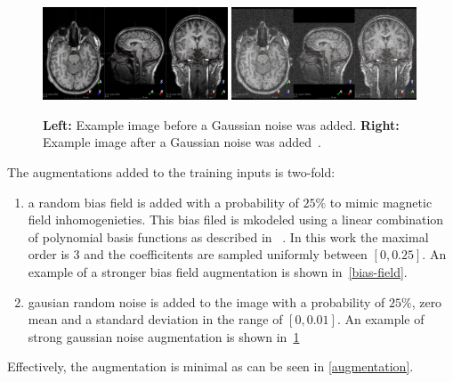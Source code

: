    \begin{figure}[h]
   \begin{center}
      \includegraphics[keepaspectratio, width=0.49\textwidth]{img/random_noise-0.png}
      \includegraphics[keepaspectratio, width=0.49\textwidth]{img/random_noise-1.png}
   \end{center}
   \caption{
      \textbf{Left:} Example image before a Gaussian noise was added.
      \textbf{Right:} Example image after a Gaussian noise was added~\autocite{noauthor_augmentation_nodate}.
   }
   \label{random-noise}
\end{figure}


The augmentations added to the training inputs is two-fold:
\begin{enumerate}
 \item a random bias field is added with a probability of $25\%$ to mimic magnetic field inhomogenieties. This bias filed is mkodeled using a linear combination of polynomial basis functions as described in ~\autocite{van_leemput_automated_1999}.
      In this work the maximal order is $3$ and the coefficitents are sampled uniformly between $[0, 0.25]$.
      An example of a stronger bias field augmentation is shown in~\ref{bias-field}.

 \item gausian random noise is added to the image with a probability of $25\%$, zero mean and a standard deviation in the range of $[0, 0.01]$.
      An example of strong gaussian noise augmentation is shown in~\ref{random-noise}
\end{enumerate}
Effectively, the augmentation is minimal as can be seen in \ref{augmentation}.


